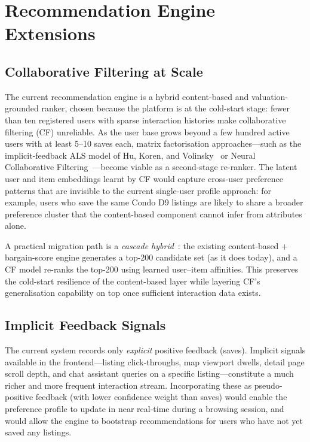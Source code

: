 \section{Recommendation Engine Extensions}

\subsection{Collaborative Filtering at Scale}

The current recommendation engine is a hybrid content-based and valuation-grounded ranker,
chosen because the platform is at the cold-start stage: fewer than ten registered users with
sparse interaction histories make collaborative filtering (CF) unreliable. As the user base
grows beyond a few hundred active users with at least 5--10 saves each, matrix factorisation
approaches---such as the implicit-feedback ALS model of Hu, Koren, and
Volinsky~\cite{hu2008collaborative} or Neural Collaborative Filtering~\cite{he2017neural}---become
viable as a second-stage re-ranker. The latent user and item embeddings learnt by CF would
capture cross-user preference patterns that are invisible to the current single-user
profile approach: for example, users who save the same Condo D9 listings are likely to
share a broader preference cluster that the content-based component cannot infer from
attributes alone.

A practical migration path is a \textit{cascade hybrid}~\cite{burke2002hybrid}: the existing
content-based + bargain-score engine generates a top-200 candidate set (as it does today),
and a CF model re-ranks the top-200 using learned user--item affinities. This preserves
the cold-start resilience of the content-based layer while layering CF's generalisation
capability on top once sufficient interaction data exists.

\subsection{Implicit Feedback Signals}

The current system records only \textit{explicit} positive feedback (saves). Implicit
signals available in the frontend---listing click-throughs, map viewport dwells, detail
page scroll depth, and chat assistant queries on a specific listing---constitute a much
richer and more frequent interaction stream. Incorporating these as pseudo-positive
feedback (with lower confidence weight than saves) would enable the preference profile
to update in near real-time during a browsing session, and would allow the engine to
bootstrap recommendations for users who have not yet saved any listings.


